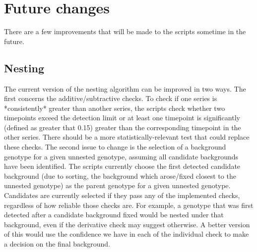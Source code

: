 \documentclass{report}
\begin{document}
\chapter{Future changes}

There are a few improvements that will be made to the scripts sometime in the future.

\section{Nesting}
The current version of the nesting algorithm can be improved in two ways. The first concerns the additive/subtractive checks. To check if one series is *consistently* greater than another series, the scripts check whether two timepoints exceed the detection limit or at least one timepoint is significantly (defined as greater that 0.15) greater than the corresponding timepoint in the other series. There should be a more statistically-relevant test that could replace these checks. The second issue to change is the selection of a background genotype for a given unnested genotype, assuming all candidate backgrounds have been identified. The scripts currently choose the first detected candidate background (due to sorting, the background which arose/fixed closest to the unnested genotype) as the parent genotype for a given unnested genotype. Candidates are currently selected if they pass any of the implemented checks, regardless of how reliable those checks are. For example, a genotype that was first detected after a candidate background fixed would be nested under that background, even if the derivative check may suggest otherwise. A better version of this would use the confidence we have in each of the individual check to make a decision on the final background.
\end{document}
